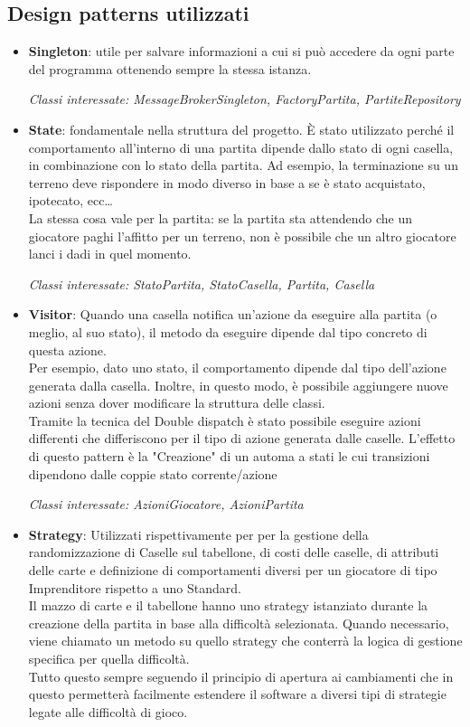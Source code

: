 \documentclass{article}
\begin{document}
\subsection{Design patterns utilizzati}
    \begin{itemize}
        \item \textbf{Singleton}: utile per salvare informazioni a cui si può accedere da ogni parte del programma ottenendo sempre la stessa istanza. 
        
        
        \textit{Classi interessate: MessageBrokerSingleton, FactoryPartita, PartiteRepository} 
        
        
        \item \textbf{State}: fondamentale nella struttura del progetto. È stato utilizzato perché il comportamento all'interno di una partita dipende dallo stato di ogni casella, in combinazione con lo stato della partita. Ad esempio, la terminazione su un terreno deve rispondere in modo diverso in base a se è stato acquistato, ipotecato, ecc… \\ La stessa cosa vale per la partita: se la partita sta attendendo che un giocatore paghi l'affitto per un terreno, non è possibile che un altro giocatore lanci i dadi in quel momento. 
        
        \textit{Classi interessate: StatoPartita, StatoCasella, Partita, Casella} 
        
        
        \item \textbf{Visitor}: Quando una casella notifica un'azione da eseguire alla partita (o meglio, al suo stato), il metodo da eseguire dipende dal tipo concreto di questa azione. \\Per esempio, dato uno stato, il comportamento dipende dal tipo dell'azione generata dalla casella. Inoltre, in questo modo, è possibile aggiungere nuove azioni senza dover modificare la struttura delle classi.\\Tramite la tecnica del Double dispatch è stato possibile eseguire azioni differenti che differiscono per il tipo di azione generata dalle caselle. L'effetto di questo pattern è la "Creazione" di un automa a stati le cui transizioni dipendono dalle coppie stato corrente/azione
        
        \textit{Classi interessate: AzioniGiocatore, AzioniPartita} 
        
        
        \item \textbf{Strategy}: Utilizzati rispettivamente per per la gestione della randomizzazione di Caselle sul tabellone, di costi delle caselle, di attributi delle carte e definizione di comportamenti diversi per un giocatore di tipo Imprenditore rispetto a uno Standard. 
        \\Il mazzo di carte e il tabellone hanno uno strategy istanziato durante la creazione della partita in base alla difficoltà selezionata. Quando necessario, viene chiamato un metodo su quello strategy che conterrà la logica di gestione specifica per quella difficoltà.
        \\Tutto questo sempre seguendo il principio di apertura ai cambiamenti che in questo permetterà facilmente estendere il software a diversi tipi di strategie legate alle difficoltà di gioco.
        

\end{itemize}
\end{document}
